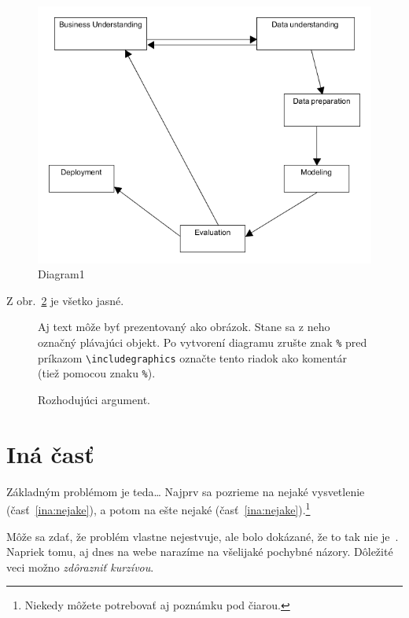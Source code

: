 \documentclass[10pt,twocolumn,twoside,slovak,a4paper]{article}
\begin{document}
\begin{figure}[b]
\includegraphics[scale=0.4]{diagram1.png}
  \caption{ Diagram1}
  \label{fig:Diagram1}
\end{figure}

Z obr.~\ref{f:rozhod} je všetko jasné. 

\begin{figure}[tbh]
\centering
Aj text môže byť prezentovaný ako obrázok. Stane sa z neho označný plávajúci objekt. Po vytvorení diagramu zrušte znak \texttt{\%} pred príkazom \verb|\includegraphics| označte tento riadok ako komentár (tiež pomocou znaku \texttt{\%}).
\caption{Rozhodujúci argument.}
\label{f:rozhod}
\end{figure}



\section{Iná časť} \label{ina}

Základným problémom je teda\ldots{} Najprv sa pozrieme na nejaké vysvetlenie (časť~\ref{ina:nejake}), a potom na ešte nejaké (časť~\ref{ina:nejake}).\footnote{Niekedy môžete potrebovať aj poznámku pod čiarou.}

Môže sa zdať, že problém vlastne nejestvuje\cite{Coplien:MPD}, ale bolo dokázané, že to tak nie je~\cite{Czarnecki:Staged, Czarnecki:Progress}. Napriek tomu, aj dnes na webe narazíme na všelijaké pochybné názory\cite{PLP-Framework}. Dôležité veci možno \emph{zdôrazniť kurzívou}.
\end{document}
